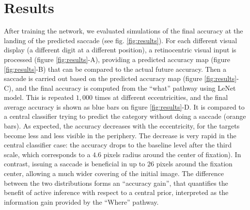 \section{Results}
\label{sec:results}
After training the network, we evaluated simulations of the final accuracy at the landing of the predicted saccade (see fig. \ref{fig:results}). For each different visual display (a different digit at a different position), a retinocentric visual input is processed (figure \ref{fig:results}-A), providing a predicted accuracy map (figure \ref{fig:results}-B) that can be compared to the actual future accuracy. Then a saccade is carried out based on the predicted accuracy map (figure \ref{fig:results}-C), and the final accuracy is computed from the ``what'' pathway using LeNet model. This is repeated $1,000$ times at different eccentricities, and the final average accuracy is shown as blue bars on figure \ref{fig:results}-D. It is compared to a central classifier trying to predict the category without doing a saccade (orange bars). As expected, the  accuracy decreases with the eccentricity, for the targets become less and less visible in the periphery. The decrease is very rapid in the central classifier case: the accuracy drops to the baseline level %
after the third scale, which corresponds to a $4.6$ pixels radius around the center of fixation). In contrast, issuing a saccade is beneficial in up to $26$ pixels around the fixation center, allowing a much wider covering of the initial image. The difference between the two distributions forms an ``accuracy gain'', that quantifies the benefit of active inference with respect to a central prior, interpreted as the information gain provided by the ``Where'' pathway.
